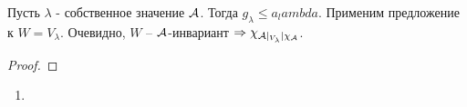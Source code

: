 \documentclass[main]{subfiles}
\begin{document}
\begin{corollary}
    Пусть $\lambda$ - собственное значение $\mathcal{A}$. Тогда $g_\lambda \leq a_lambda$.
    Применим предложение к $W=V_\lambda$. Очевидно, $W$ -- $\mathcal{A}$-инвариант $\Rightarrow
        \chi_{\mathcal{A}|_{V_\lambda} | \chi_{\mathcal{A}}}$.


\end{corollary}

\begin{theorem}

\end{theorem}

\begin{proof}

\end{proof}

\begin{example}
    \begin{enumerate}
        \item
    \end{enumerate}
\end{example}
\end{document}
